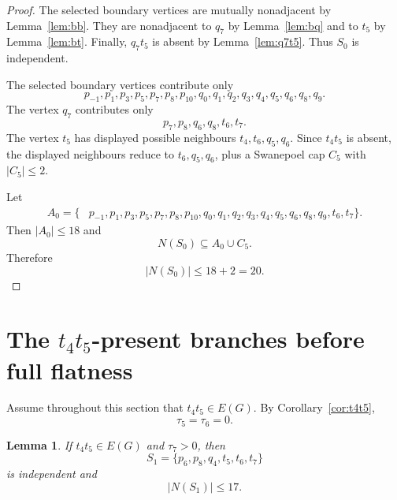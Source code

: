 \documentclass[11pt]{article}
\newtheorem{lemma}[theorem]{Lemma}
\begin{document}
\begin{proof}
The selected boundary vertices are mutually nonadjacent by Lemma~\ref{lem:bb}. They are nonadjacent to $q_7$ by Lemma~\ref{lem:bq} and to $t_5$ by Lemma~\ref{lem:bt}. Finally, $q_7t_5$ is absent by Lemma~\ref{lem:q7t5}. Thus $S_0$ is independent.

The selected boundary vertices contribute only
\[
 p_{-1},p_1,p_3,p_5,p_7,p_8,p_{10},
 q_0,q_1,q_2,q_3,q_4,q_5,q_6,q_8,q_9.
\]
The vertex $q_7$ contributes only
\[
 p_7,p_8,q_6,q_8,t_6,t_7.
\]
The vertex $t_5$ has displayed possible neighbours $t_4,t_6,q_5,q_6$. Since $t_4t_5$ is absent, the displayed neighbours reduce to $t_6,q_5,q_6$, plus a Swanepoel cap $C_5$ with $|C_5|\le2$.

Let
\[
\begin{aligned}
A_0=\{&p_{-1},p_1,p_3,p_5,p_7,p_8,p_{10},q_0,q_1,q_2,q_3,q_4,q_5,q_6,q_8,q_9,t_6,t_7\}.
\end{aligned}
\]
Then $|A_0|\le18$ and
\[
 N(S_0)\subseteq A_0\cup C_5.
\]
Therefore
\[
 |N(S_0)|\le18+2=20.
\]
\end{proof}

\section{The $t_4t_5$-present branches before full flatness}

Assume throughout this section that $t_4t_5\in E(G)$. By Corollary~\ref{cor:t4t5},
\[
 \tau_5=\tau_6=0.
\]

\begin{lemma}\label{lem:S1}
If $t_4t_5\in E(G)$ and $\tau_7>0$, then
\[
 S_1=\{p_6,p_8,q_4,t_5,t_6,t_7\}
\]
is independent and
\[
 |N(S_1)|\le17.
\]
\end{lemma}
\end{document}

